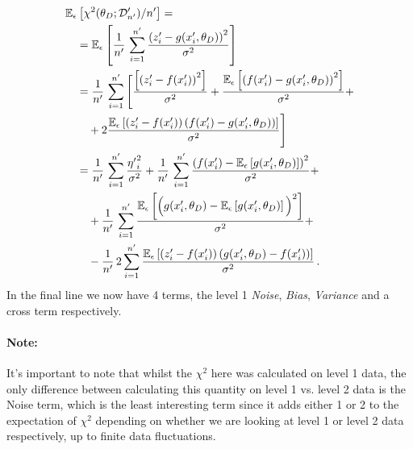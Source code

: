 \begin{align}
    & \mathbb{E}_{\epsilon}\left[\chi^2(\theta_D; \mathcal{D}'_{n'})/n'\right] = \nonumber\\
    & \quad = \mathbb{E}_{\epsilon}\left[
        \frac{1}{n'}\, \sum_{i=1}^{n'} 
        \frac{\left(
            z'_i - g(x'_i,\theta_D)
        \right)^2}{\sigma^2}   
    \right] \\
    & \quad = \frac{1}{n'}\, \sum_{i=1}^{n'} \Bigg[
        \frac{\left[
            \left(z'_i - f(x'_i)\right)^2    
        \right]}{\sigma^2}    
        + \frac{
            \mathbb{E}_{\epsilon}\left[\left(f(x'_i)-g(x'_i,\theta_D)\right)^2\right]
            }{\sigma^2} + \nonumber \\
    & \quad \quad + 2\frac{\mathbb{E}_{\epsilon}
    \left[
        \left(z'_i - f(x'_i)\right)\left(f(x'_i)-g(x'_i,\theta_D)\right)
    \right]}{\sigma^2}
    \Bigg] \\
    & \quad = \frac{1}{n'}\, \sum_{i=1}^{n'}
        \frac{{\eta'}_i^2}{\sigma^2} +
    \frac{1}{n'}\, \sum_{i=1}^{n'} \frac{
        \left(f(x'_i) - \mathbb{E}_{\epsilon}\left[g(x'_i,\theta_D)\right]\right)^2
        }{\sigma^2} + \nonumber \\
    & \quad \quad +
    \frac{1}{n'}\, \sum_{i=1}^{n'} \frac{
                \mathbb{E}_{\epsilon}\left[\Big(g(x'_i,\theta_D) - 
                \mathbb{E}_{\epsilon}\left[g(x'_i,\theta_D)\right]\Big)^2\right]
            }{\sigma^2} + \nonumber \\
    & \quad \quad -
    \frac{1}{n'}\, 2 \sum_{i=1}^{n'} \frac{\mathbb{E}_{\epsilon}
        \left[
            \left(z'_i - f(x'_i)\right)\left(g(x'_i,\theta_D) - f(x'_i)\right)
        \right]}{\sigma^2} \, . \label{eq:NNPDFGenErr}
\end{align}
In the final line we now have 4 terms, the level 1 {\em Noise},
{\em Bias}, {\em Variance} and a cross term respectively.

\paragraph[]{Note:} It's important to note that whilst the $\chi^2$ here was
calculated on level 1 data, the only difference between calculating this quantity
on level 1 vs. level 2 data is the Noise term, which is the least interesting
term since it adds either 1 or 2 to the expectation of $\chi^2$ depending on
whether we are looking at level 1 or level 2 data respectively, up to finite
data fluctuations.


